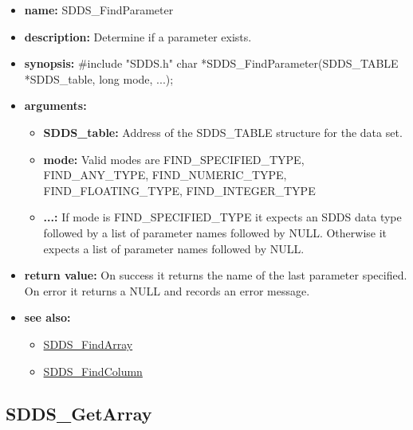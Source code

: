 \documentclass[11pt]{article}
\newcommand{\progref}[1]{\hyperref{SDDS_#1}{{\tt SDDS\_#1} (}{)}{SDDS_#1}}
\begin{document}
\begin{itemize}
\item {\bf name:}\newline
SDDS\_FindParameter
\item {\bf description:}\newline
Determine if a parameter exists.
\item {\bf synopsis:} \#include "SDDS.h"\newline
char *SDDS\_FindParameter(SDDS\_TABLE *SDDS\_table, long mode, ...);
\item {\bf arguments:}
\begin{itemize}
\item {\bf SDDS\_table:} Address of the SDDS\_TABLE structure for the data set.
\item {\bf mode:} Valid modes are FIND\_SPECIFIED\_TYPE, FIND\_ANY\_TYPE, FIND\_NUMERIC\_TYPE, FIND\_FLOATING\_TYPE, FIND\_INTEGER\_TYPE
\item {\bf ...:} If mode is FIND\_SPECIFIED\_TYPE it expects an SDDS data type followed by a list of parameter names followed by NULL. Otherwise it expects a list of parameter names followed by NULL.
\end{itemize}
\item {\bf return value:}\newline
On success it returns the name of the last parameter specified. On error it returns a NULL and records an error message.
\item {\bf see also:}
\begin{itemize}
\item \progref{FindArray}
\item \progref{FindColumn}
\end{itemize}
\end{itemize}

\subsection{SDDS\_GetArray}
\label{SDDS_GetArray}
\end{document}
